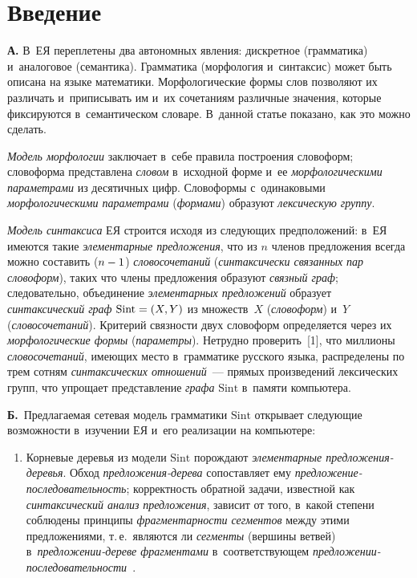 \begin{multicols}{2}

\label{st\stat}
    
\section{Введение}

    \textbf{А.} В~ЕЯ переплетены два автономных 
явления: дискретное (грамматика) и~аналоговое (семантика). Грамматика 
(морфология и~синтаксис) может быть описана на языке математики. 
Морфологические формы слов позволяют их различать и~приписывать им 
и~их сочетаниям различные значения, которые фиксируются в~семантическом 
словаре. В~данной статье показано, как это можно сделать.
    
    \textit{Модель морфологии} заключает в~себе правила построения 
словоформ; словоформа представлена \textit{словом} в~исходной форме и~ее 
\textit{морфологическими параметрами} из десятичных цифр. Словоформы 
с~одинаковыми \textit{морфологическими параметрами} (\textit{формами}) 
образуют \textit{лексическую группу}. 
    
     \textit{Модель синтаксиса} ЕЯ строится исходя из следующих 
предположений: в~ЕЯ имеются такие \textit{элементарные предложения}, что 
из $n$ членов предложения всегда можно составить ($n\hm-1$) 
\textit{словосочетаний} (\textit{синтаксически связанных пар словоформ}), 
таких что члены предложения образуют \textit{связный граф}; следовательно, 
объединение \textit{элементарных предложений} образует 
\textit{синтаксический граф} $\mathrm{Sint}\hm = (X, Y)$ из 
множеств~$X$ (\textit{словоформ}) и~$Y$ (\textit{словосочетаний}). 
Критерий связности двух словоформ определяется через их 
\textit{морфологические формы} (\textit{параметры}). Нетрудно 
проверить~[1], что миллионы \textit{словосочетаний}, имеющих место 
в~грамматике русского языка, распределены по трем сотням 
\textit{синтаксических отношений}~--- прямых произведений лексических 
групп, что упрощает представление \textit{графа} $\mathrm{Sint}$ в~памяти 
компьютера.
     
    \textbf{Б.}\ Предлагаемая сетевая модель грамматики $\mathrm{Sint}$ открывает 
следующие возможности в~изучении ЕЯ и~его реализации на компьютере:
    \begin{enumerate}[1.]
    \item Корневые деревья из модели $\mathrm{Sint}$ порождают 
\textit{элементарные пред\-ло\-же\-ния-де\-ревья}. Обход 
\textit{пред\-ло\-же\-ния-де\-ре\-ва} сопоставляет ему 
\textit{пред\-ло\-же\-ние-по\-сле\-до\-ва\-тель\-ность}; 
корректность обратной задачи, известной как 
\textit{синтаксический анализ}\linebreak
\textit{предложения}, зависит от того, в~какой степени\linebreak 
соблюдены принципы \textit{фрагментарности сегментов} между этими 
предложениями, т.\,е.\ являются ли \textit{сегменты} (вершины ветвей)  
в~\textit{пред\-ло\-же\-нии-де\-ре\-ве фрагментами} в~соответствующем 
\textit{пред\-ло\-же\-нии-по\-сле\-до\-ва\-тель\-ности}~\cite{2-shi}. 
    

\end{enumerate}
\end{multicols}
